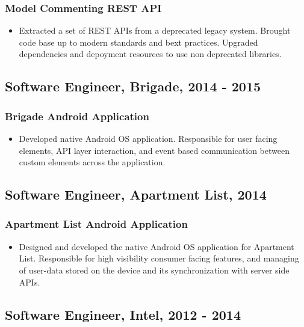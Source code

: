 \documentclass[11pt]{article}
\begin{document}
\subsubsection*{Model Commenting REST API}
\label{sec-1-2-2}

\begin{itemize}
\item Extracted a set of REST APIs from a deprecated legacy system. Brought code base up to modern standards and bext practices. Upgraded dependencies and depoyment resources to use non deprecated libraries.
\end{itemize}
\subsection*{Software Engineer, Brigade, 2014 - 2015}
\label{sec-1-3}
\subsubsection*{Brigade Android Application}
\label{sec-1-3-1}

\begin{itemize}
\item Developed native Android OS application. Responsible for user facing elements, API layer interaction, and event based communication between custom elements across the application.
\end{itemize}
\subsection*{Software Engineer, Apartment List, 2014}
\label{sec-1-4}
\subsubsection*{Apartment List Android Application}
\label{sec-1-4-1}

\begin{itemize}
\item Designed and developed the native Android OS application for Apartment List. Responsible for high visibility consumer facing features, and managing of user-data stored on the device and its synchronization with server side APIs.
\end{itemize}

\pagebreak

\subsection*{Software Engineer, Intel, 2012 - 2014}
\label{sec-1-5}
\end{document}
